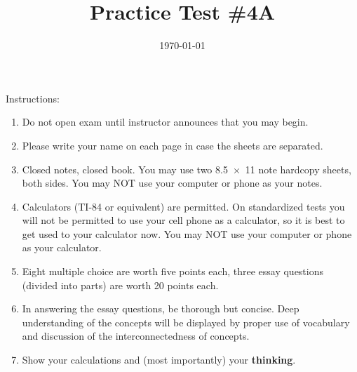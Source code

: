 \documentclass[exam,addpoints, noanswers]{exam}
\title{Practice Test \#4A}
\date{\today}
\author{\mobeardInstructorShort}
\begin{document}
\maketitle
\vfill
\mobeardExamNameBlock
\vfill
Instructions: 
\begin{enumerate}
\item Do not open exam until instructor announces that you may begin.
\item Please write your name on each page in case the sheets are separated. 
\item Closed notes, closed book.  You may use two \SI{8.5x11}{\inch} note hardcopy sheets, both sides. You may NOT use your computer or phone as your notes. 
\item Calculators (TI-84 or equivalent) are permitted.  On standardized tests you will not be permitted to use your cell phone as a calculator, so it is best to get used to your calculator now. You may NOT use your computer or phone as your calculator. 
\item Eight multiple choice are worth five points each, three essay questions (divided into parts) are worth 20 points each. 
\item In answering the essay questions, be thorough but concise. Deep understanding of the concepts will be displayed by proper use of vocabulary and discussion of the interconnectedness of concepts. 
\item Show your calculations and (most importantly) your \textbf{thinking}.
\end{enumerate}
\vfill
\begin{center}
\gradetable[h][questions]
\end{center}
\clearpage
\end{document}
